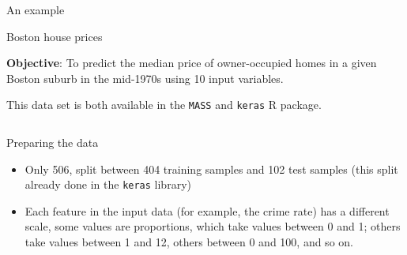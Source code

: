 \documentclass[10pt,ignorenonframetext,]{beamer}
\providecommand{\tightlist}{%
  \setlength{\itemsep}{0pt}\setlength{\parskip}{0pt}}
\begin{document}
\begin{frame}[fragile]{An example}
\protect\hypertarget{an-example}{}

\begin{block}{Boston house prices}

\vspace{2mm}

\textbf{Objective}: To predict the median price of owner-occupied homes
in a given Boston suburb in the mid-1970s using 10 input variables.

This data set is both available in the \texttt{MASS} and \texttt{keras}
R package.

\(~\)

\begin{block}{Preparing the data}

\vspace{2mm}

\begin{itemize}
\tightlist
\item
  Only 506, split between 404 training samples and 102 test samples
  (this split already done in the \texttt{keras} library)
\item
  Each feature in the input data (for example, the crime rate) has a
  different scale, some values are proportions, which take values
  between 0 and 1; others take values between 1 and 12, others between 0
  and 100, and so on.
\end{itemize}

\end{block}

\end{block}

\end{frame}
\end{document}
